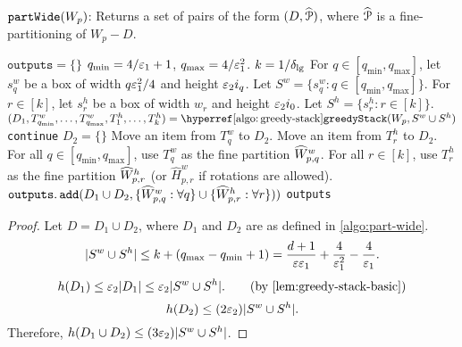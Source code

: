 \begin{algorithm}[!htb]
\caption{$\operatorname{\mathtt{partWide}}(W_p)$:
Returns a set of pairs of the form $(D, \widehat{\mathcal{P}})$,
where $\widehat{\mathcal{P}}$ is a fine-partitioning of $W_p - D$.}
\label{algo:part-wide}
\begin{algorithmic}[1]
\State $\texttt{outputs} = \{\}$
\State $q_{\min} = 4/\varepsilon_1+1$, $q_{\max} = 4/\varepsilon_1^2$.
\State $k = 1/\delta_{\mathrm{lg}}$
        \State For $q \in [q_{\min}, q_{\max}]$, let $s_q^w$ be a box of width
            $q\varepsilon_1^2/4$ and height $\varepsilon_2 i_q$.
        \State Let $S^w = \{s_q^w: q \in [q_{\min}, q_{\max}]\}$.
        \State For $r \in [k]$, let $s_r^h$ be a box of width $w_r$ and height $\varepsilon_2 i_0$.
        \State Let $S^h = \{s_r^h: r \in [k]\}$.
        \State $(D_1, T_{q_{\min}}^w, \ldots, T_{q_{\max}}^w, T_1^h, \ldots, T_k^h)
            = \greedyStackHyp(W_p, S^w \cup S^h)$
            \State \texttt{continue}
        \EndIf
        \State $D_2 = \{\}$
                \State Move an item from $T_q^w$ to $D_2$.
            \EndWhile
        \EndFor
                \State Move an item from $T_r^h$ to $D_2$.
            \EndWhile
        \EndFor
        \State For all $q \in [q_{\min}, q_{\max}]$,
            use $T_q^w$ as the fine partition $\widehat{W}^w_{p,q}$.
        \State For all $r \in [k]$, use $T_r^h$ as the fine partition $\widehat{W}^h_{p,r}$
            (or $\widehat{H}^w_{p,r}$ if rotations are allowed).
        \State $\operatorname{\mathtt{outputs.add}}(D_1 \cup D_2, \{\widehat{W}^w_{p,q}: \forall q\}
            \cup \{\widehat{W}^h_{p,r}: \forall r\}))$
    \EndFor
\EndFor
\State \Return \texttt{outputs}
\end{algorithmic}
\end{algorithm}

\rthmPartWideDiscard*
\begin{proof}
Let $D = D_1 \cup D_2$, where $D_1$ and $D_2$ are as defined in \cref{algo:part-wide}.
\[ |S^w \cup S^h| \le k + (q_{\max} - q_{\min} + 1)
= \frac{d+1}{\varepsilon\varepsilon_1} + \frac{4}{\varepsilon_1^2} - \frac{4}{\varepsilon_1}. \]
\[ h(D_1) \le \epsSmall|D_1| \le \epsSmall|S^w \cup S^h|.  \tag{by \cref{lem:greedy-stack-basic}} \]
\[ h(D_2) \le (2\varepsilon_2)|S^w \cup S^h|. \]
Therefore, $h(D_1 \cup D_2) \le (3\varepsilon_2)|S^w \cup S^h|$.
\end{proof}

